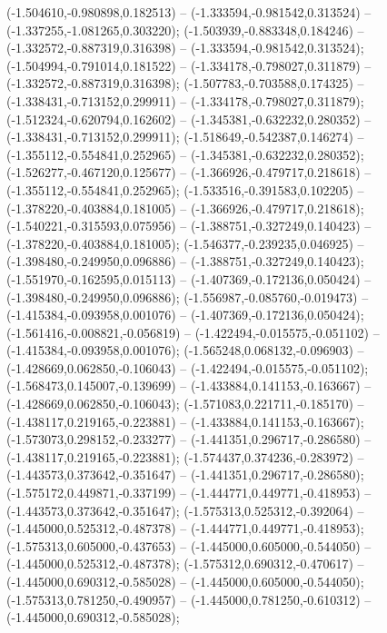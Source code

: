  (-1.504610,-0.980898,0.182513) -- (-1.333594,-0.981542,0.313524) -- (-1.337255,-1.081265,0.303220);
 (-1.503939,-0.883348,0.184246) -- (-1.332572,-0.887319,0.316398) -- (-1.333594,-0.981542,0.313524);
 (-1.504994,-0.791014,0.181522) -- (-1.334178,-0.798027,0.311879) -- (-1.332572,-0.887319,0.316398);
 (-1.507783,-0.703588,0.174325) -- (-1.338431,-0.713152,0.299911) -- (-1.334178,-0.798027,0.311879);
 (-1.512324,-0.620794,0.162602) -- (-1.345381,-0.632232,0.280352) -- (-1.338431,-0.713152,0.299911);
 (-1.518649,-0.542387,0.146274) -- (-1.355112,-0.554841,0.252965) -- (-1.345381,-0.632232,0.280352);
 (-1.526277,-0.467120,0.125677) -- (-1.366926,-0.479717,0.218618) -- (-1.355112,-0.554841,0.252965);
 (-1.533516,-0.391583,0.102205) -- (-1.378220,-0.403884,0.181005) -- (-1.366926,-0.479717,0.218618);
 (-1.540221,-0.315593,0.075956) -- (-1.388751,-0.327249,0.140423) -- (-1.378220,-0.403884,0.181005);
 (-1.546377,-0.239235,0.046925) -- (-1.398480,-0.249950,0.096886) -- (-1.388751,-0.327249,0.140423);
 (-1.551970,-0.162595,0.015113) -- (-1.407369,-0.172136,0.050424) -- (-1.398480,-0.249950,0.096886);
 (-1.556987,-0.085760,-0.019473) -- (-1.415384,-0.093958,0.001076) -- (-1.407369,-0.172136,0.050424);
 (-1.561416,-0.008821,-0.056819) -- (-1.422494,-0.015575,-0.051102) -- (-1.415384,-0.093958,0.001076);
 (-1.565248,0.068132,-0.096903) -- (-1.428669,0.062850,-0.106043) -- (-1.422494,-0.015575,-0.051102);
 (-1.568473,0.145007,-0.139699) -- (-1.433884,0.141153,-0.163667) -- (-1.428669,0.062850,-0.106043);
 (-1.571083,0.221711,-0.185170) -- (-1.438117,0.219165,-0.223881) -- (-1.433884,0.141153,-0.163667);
 (-1.573073,0.298152,-0.233277) -- (-1.441351,0.296717,-0.286580) -- (-1.438117,0.219165,-0.223881);
 (-1.574437,0.374236,-0.283972) -- (-1.443573,0.373642,-0.351647) -- (-1.441351,0.296717,-0.286580);
 (-1.575172,0.449871,-0.337199) -- (-1.444771,0.449771,-0.418953) -- (-1.443573,0.373642,-0.351647);
 (-1.575313,0.525312,-0.392064) -- (-1.445000,0.525312,-0.487378) -- (-1.444771,0.449771,-0.418953);
 (-1.575313,0.605000,-0.437653) -- (-1.445000,0.605000,-0.544050) -- (-1.445000,0.525312,-0.487378);
 (-1.575312,0.690312,-0.470617) -- (-1.445000,0.690312,-0.585028) -- (-1.445000,0.605000,-0.544050);
 (-1.575313,0.781250,-0.490957) -- (-1.445000,0.781250,-0.610312) -- (-1.445000,0.690312,-0.585028);
